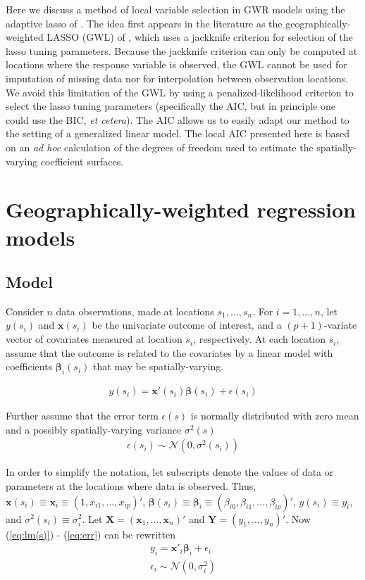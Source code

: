 \documentclass[authoryear, review, 11pt]{elsarticle}
\begin{document}
	Here we discuss a method of local variable selection in GWR models using the adaptive lasso of \cite{Zou:2006}. The idea first appears in the literature as the geographically-weighted LASSO (GWL) of \cite{Wheeler:2009}, which uses a jackknife criterion for selection of the lasso tuning parameters. Because the jackknife criterion can only be computed at locations where the response variable is observed, the GWL cannot be used for imputation of missing data nor for interpolation between observation locations. We avoid this limitation of the GWL by using a penalized-likelihood criterion to select the lasso tuning parameters (specifically the AIC, but in principle one could use the BIC, \emph{et cetera}). The AIC allows us to easily adapt our method to the setting of a generalized linear model. The local AIC presented here is based on an \emph{ad hoc} calculation of the degrees of freedom used to estimate the spatially-varying coefficient surfaces.
	
\section{Geographically-weighted regression models \label{section:GWR}}

	\subsection{Model}
	Consider $n$ data observations, made at locations $s_1, \dots, s_n$. For $i = 1, \dots, n$, let $y(s_i)$ and $\bm{x}(s_i)$ be the univariate outcome of interest, and a $(p+1)$-variate vector of covariates measured at location $s_i$, respectively. At each location $s_i$, assume that the outcome is related to the covariates by a linear model with coefficients $\bm{\beta}_i(s_i)$ that may be spatially-varying.

	\begin{eqnarray}
		y(s_i) = \bm{x}'(s_i) \bm{\beta}(s_i) + \epsilon(s_i)
	\label{eq:lm(s)}
	\end{eqnarray}
	
	Further assume that the error term $\epsilon(s)$ is normally distributed with zero mean and a possibly spatially-varying variance $\sigma^2(s)$
	\begin{eqnarray}
		\epsilon(s_i) \sim \mathcal{N} \left( 0,\sigma^2(s_i) \right)
	\label{eq:err}
	\end{eqnarray}
	
	In order to simplify the notation, let subscripts denote the values of data or parameters at the locations where data is observed. Thus, $\bm{x}(s_i) \equiv \bm{x}_i \equiv \left( 1, x_{i1}, \dots, x_{ip} \right)'$, $\bm{\beta}(s_i) \equiv \bm{\beta}_i \equiv \left(\beta_{i0}, \beta_{i1}, \dots, \beta_{ip} \right)'$, $y(s_i) \equiv y_i$, and $\sigma^2(s_i) \equiv \sigma^2_i$. Let $\bm{X} = \left( \bm{x}_1, \dots, \bm{x}_n \right)'$ and $\bm{Y} = \left( y_1, \dots, y_n \right)'$. Now (\ref{eq:lm(s)}) - (\ref{eq:err}) can be rewritten
	\begin{eqnarray}
		y_i = \bm{x}'_i \bm{\beta}_i + \epsilon_i\\
		\epsilon_i \sim \mathcal{N} \left( 0,\sigma_i^2 \right)
	\end{eqnarray}
	
\end{document}
